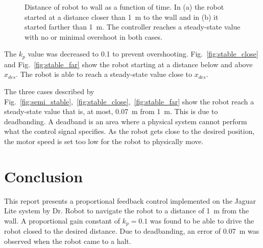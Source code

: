 \documentclass[conference]{../IEEEtran}
\begin{document}
\begin{figure}[t]
  \centering
  \caption{Distance of robot to wall as a function of time.  In (a) the robot started at a
    distance closer than \SI{1}{\meter} to the wall and in (b) it started farther than
    \SI{1}{\meter}. The controller reaches a steady-state value with no or minimal
  overshoot in both cases.}
  \label{fig:stable_controller}
\end{figure}

The $k_p$ value was decreased to 0.1 to prevent overshooting. Fig.~\ref{fig:stable_close}
and Fig.~\ref{fig:stable_far} show the robot starting at a distance below and above
$x_{des}$. The robot is able to reach a steady-state value close to $x_{des}$.

The three cases described by
Fig.~\ref{fig:semi_stable},~\ref{fig:stable_close},~\ref{fig:stable_far} show the robot
reach a steady-state value that is, at most, \SI{0.07}{\meter} from \SI{1}{\meter}. This is due to
deadbanding. A deadband is an area where a physical system cannot perform what the control
signal specifies. As the robot gets close to the desired position, the motor speed is set
too low for the robot to physically move.

\section{Conclusion}
This report presents a proportional feedback control implemented on the Jaguar Lite system
by Dr. Robot to navigate the robot to a distance of \SI{1}{\meter} from the wall. A
proportional gain constant of $k_{p} = 0.1$ was found to be able to drive the robot closed
to the desired distance. Due to deadbanding, an error of \SI{0.07}{\meter} was
observed when the robot came to a halt.
\end{document}
